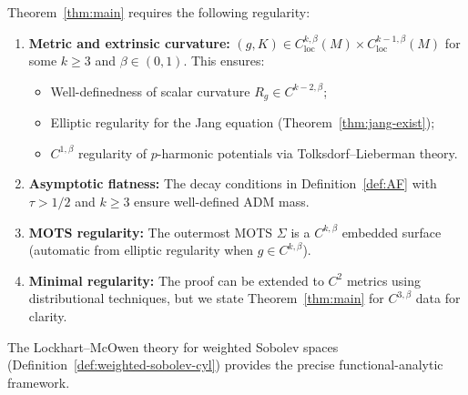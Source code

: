 \begin{remark}\label{rem:regularity}
Theorem~\ref{thm:main} requires the following regularity:
\begin{enumerate}[label=\textup{(\roman*)}]
    \item \textbf{Metric and extrinsic curvature:} $(g, K) \in C^{k,\beta}_{\mathrm{loc}}(M) \times C^{k-1,\beta}_{\mathrm{loc}}(M)$ for some $k \geq 3$ and $\beta \in (0,1)$. This ensures:
    \begin{itemize}
        \item Well-definedness of scalar curvature $R_g \in C^{k-2,\beta}$;
        \item Elliptic regularity for the Jang equation (Theorem~\ref{thm:jang-exist});
        \item $C^{1,\beta}$ regularity of $p$-harmonic potentials via Tolksdorf--Lieberman theory.
    \end{itemize}
    \item \textbf{Asymptotic flatness:} The decay conditions in Definition~\ref{def:AF} with $\tau > 1/2$ and $k \geq 3$ ensure well-defined ADM mass.
    \item \textbf{MOTS regularity:} The outermost MOTS $\Sigma$ is a $C^{k,\beta}$ embedded surface (automatic from elliptic regularity when $g \in C^{k,\beta}$).
    \item \textbf{Minimal regularity:} The proof can be extended to $C^2$ metrics using distributional techniques, but we state Theorem~\ref{thm:main} for $C^{3,\beta}$ data for clarity.
\end{enumerate}
The Lockhart--McOwen theory for weighted Sobolev spaces (Definition~\ref{def:weighted-sobolev-cyl}) provides the precise functional-analytic framework.
\end{remark}

